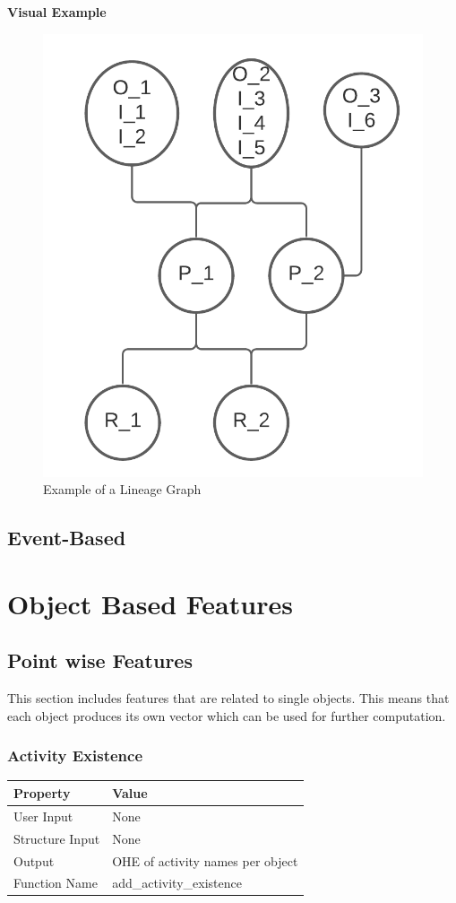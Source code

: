 \documentclass{article}
\begin{document}
\noindent\textbf{Visual Example}
\begin{figure}[h]
	\centering
	\includegraphics[scale=0.8]{images/lineage.png}
	\caption{Example of a Lineage Graph}
	\label{fig:lineage}
\end{figure}

\subsection{Event-Based}
\section{Object Based Features}
\subsection{Point wise Features}
This section includes features that are related to single objects. This means that each object produces its own vector which can be used for further computation.
\subsubsection{Activity Existence}
\begin{center}
	\begin{tabular}{| p{3cm} p{7cm} |}
		\hline
		\textbf{Property} & \textbf{Value}\\
		\hline
		User Input & None\\
		Structure Input & None\\
		Output & OHE of activity names per object\\
		Function Name & add\_activity\_existence\\
		\hline
	\end{tabular}
\end{center}
\end{document}
